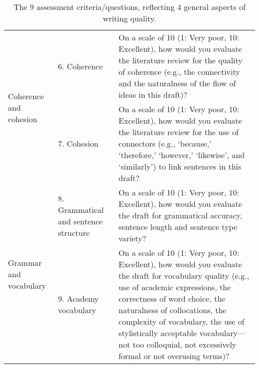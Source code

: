\begin{table*}[]
\begin{tabular}{p{2.75cm}p{3.75cm}p{7.75cm}}
     \multirow{2}{4em}{Coherence and cohesion}     & 6. Coherence & On a scale of 10 (1: Very poor, 10: Excellent), how would you evaluate the literature review for the quality of coherence (e.g., the connectivity and the naturalness of the flow of ideas in this draft)? \\ \cmidrule{2-3}

          & 7. Cohesion & On a scale of 10 (1: Very poor, 10: Excellent), how would you evaluate the literature review for the use of connectors (e.g., ‘because,’ ‘therefore,’ ‘however,’ ‘likewise’, and ‘similarly’) to link sentences in this draft? \\ \midrule

       \multirow{2}{4em}{Grammar and vocabulary}    & 8. Grammatical and sentence structure & On a scale of 10 (1: Very poor, 10: Excellent), how would you evaluate the draft for grammatical accuracy, sentence length and sentence type variety? \\ \cmidrule{2-3}
         
          & 9. Academy vocabulary & On a scale of 10 (1: Very poor, 10: Excellent), how would you evaluate the draft for vocabulary quality (e.g., use of academic expressions, the correctness of word choice, the naturalness of collocations, the complexity of vocabulary, the use of stylistically acceptable vocabulary—not too colloquial, not excessively formal or not overusing terms)? \\ \bottomrule
         
    \end{tabular}
    \caption{The 9 assessment criteria/questions, reflecting 4 general aspects of writing quality.}
    \label{tab:assessmentCriteria}
\end{table*}
